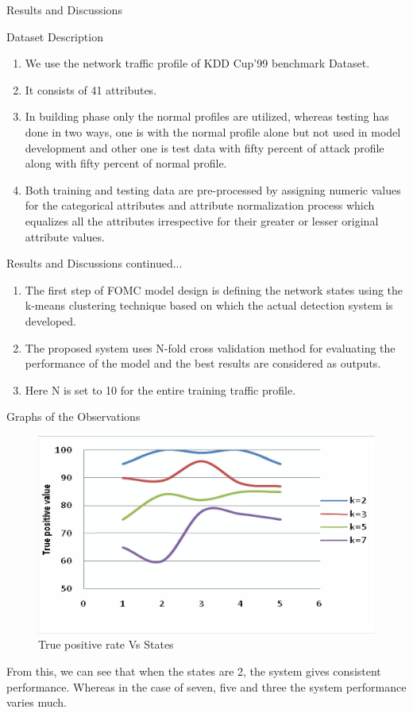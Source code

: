 \documentclass{beamer}
\begin{document}
\begin{frame}{Results and Discussions}
\begin{block}{Dataset Description}
\begin{enumerate}
    \item We use the network traffic profile of KDD Cup'99 benchmark Dataset.
    \item It consists of 41 attributes.
    \item In building phase only the normal profiles are utilized, whereas testing has done in two ways, one is with the normal profile alone but not used in model development and other one is test data with fifty percent of attack profile along with fifty percent of normal profile.
    \item Both training and testing data are pre-processed by assigning numeric values for the categorical attributes and attribute normalization process which equalizes all the attributes irrespective for their greater or lesser original attribute values.
\end{enumerate}
\end{block}
\end{frame}
\begin{frame}{Results and Discussions continued...}
\begin{enumerate}
    \item The first step of FOMC model design is defining the network states using the k-means clustering technique based on which the actual detection system is developed. 
    \item The proposed system uses N-fold cross validation method for evaluating the performance of the model and the best results are considered as outputs.
    \item Here N is set to 10 for the entire training traffic profile.
\end{enumerate}
\end{frame}
\begin{frame}{Graphs of the Observations}
\begin{figure}[h!]
    \centering
    \includegraphics[scale=0.2]{fig1.png}
    \caption{True positive rate Vs States}
    \label{fig1}
\end{figure}
From this, we can see that when the states are 2, the system gives consistent performance. Whereas in the case of seven, five and three the system performance varies much.
\end{frame}
\end{document}
